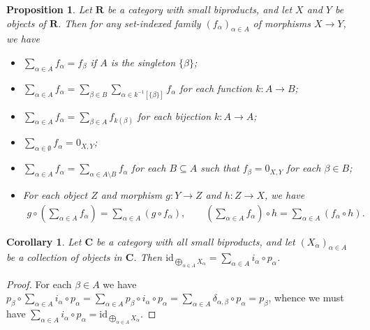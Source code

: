 \documentclass[12pt]{tac}
\newtheorem{proposition}[theorem]{Proposition}
\newtheorem{corollary}[theorem]{Corollary}
\theoremstyle{definition}
\theoremstyle{remark}
\newcommand{\<}{\langle}
\renewcommand{\>}{\rangle}
\renewcommand{\:}{\colon}
\newcommand{\id}{\mathrm{id}}
\begin{document}
 \begin{proposition}\label{prop:homsets are commutative infinitary monoids}
     Let $\mathbf R$ be a category with small biproducts, and let $X$ and $Y$ be objects of $\mathbf R$. Then for any set-indexed family $(f_\alpha)_{\alpha\in A}$ of morphisms $X\to Y$, we have
      \begin{itemize}
                 \item[(1)] $\sum_{\alpha\in A}f_\alpha=f_\beta$ if $A$ is the singleton $\{\beta\}$;
        \item[(2)] $\sum_{\alpha\in A}f_\alpha=\sum_{\beta\in B}\sum_{\alpha\in k^{-1}[\{\beta\}]}f_\alpha$ for each function $k:A\to B$;
        \item[(3)] $\sum_{\alpha\in A}f_\alpha=\sum_{\beta\in A}f_{k(\beta)}$
for each bijection $k:A\to A$;
\item[(4)] $\sum_{\alpha\in\emptyset}f_\alpha=0_{X,Y}$;
\item[(5)] $\sum_{\alpha\in A}f_\alpha=\sum_{\alpha\in A\setminus B}f_\alpha$ for each $B\subseteq A$ such that $f_\beta=0_{X,Y}$ for each $\beta\in B$;
\item[(6)] For each object $Z$ and morphism $g:Y\to Z$ and $h:Z\to X$, we have
     \begin{align*}g\circ \left(\sum_{\alpha\in A}f_\alpha \right) = \sum_{\alpha\in A}(g\circ f_\alpha), \qquad
     \left(\sum_{\alpha\in A}f_\alpha\right)\circ h = \sum_{\alpha\in A}(f_\alpha\circ h).
     \end{align*}
      \end{itemize}
 \end{proposition} 





\begin{corollary}\label{cor:sum of ip is id}
    Let $\mathbf C$ be a category with all small biproducts, and let $(X_\alpha)_{\alpha\in A}$ be a collection of objects in $\mathbf C$. Then $\id_{\bigoplus_{\alpha\in A}X_\alpha}=\sum_{\alpha\in A}i_\alpha\circ p_\alpha$.
\end{corollary}
\begin{proof}
    For each $\beta\in A$ we have $p_\beta\circ \sum_{\alpha\in A}i_\alpha\circ p_\alpha=\sum_{\alpha\in A}p_\beta\circ i_\alpha\circ p_\alpha=\sum_{\alpha\in A}\delta_{\alpha,\beta}\circ p_\alpha=p_\beta$, whence we must have $\sum_{\alpha\in A}i_\alpha\circ p_\alpha=\id_{\bigoplus_{\alpha\in A}X_\alpha}$.
\end{proof}
\end{document}
